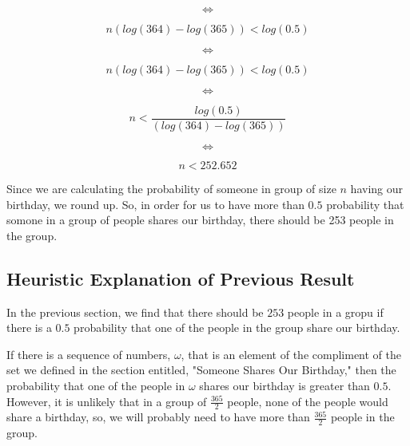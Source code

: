 \documentclass[a4paper,11pt]{article}
\begin{document}
\begin{equation}
\iff
\end{equation}

\begin{equation}
   n \left( log\left( 364 \right) -  log\left(365 \right) \right) <  
    log \left( 0.5 \right)
\end{equation}


\begin{equation}
\iff
\end{equation}

\begin{equation}
   n \left( log\left( 364 \right) -  log\left(365 \right) \right) <  
    log \left( 0.5 \right)
\end{equation}

\begin{equation}
\iff
\end{equation}

\begin{equation}
   n <  
    \frac
    {
      log \left( 0.5 \right){}
    }
    {
      \left( log\left( 364 \right) -  log\left(365 \right) \right){}
    }
\end{equation}

\begin{equation}
\iff
\end{equation}

\begin{equation}
   n < 252.652
\end{equation}

Since we are calculating the probability of someone in group of size $n$
having our birthday, we round up.  So, in order for us to have more than
$0.5$ probability that somone in a group of people shares our birthday,
there should be 253 people in the group.

\subsection{Heuristic Explanation of Previous Result}

In the previous section, we find that there should be $253$ people in a
gropu if there is a $0.5$ probability that one of the people in the
group share our birthday.

If there is a sequence of numbers, $\omega$, that is an element of the
compliment of the set we defined in the section entitled, "Someone 
Shares Our Birthday," then the probability that one of the people in
$\omega$ shares our birthday is greater than $0.5$.  However, it is
unlikely that in a group of $\frac{365}{2}$ people, none of the people
would share a birthday, so, we will probably need to have more than
$\frac{365}{2}$ people in the group.
\end{document}
